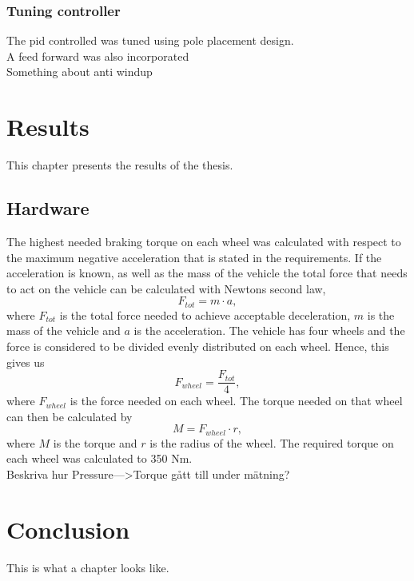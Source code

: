 \documentclass[a4paper,11pt]{kth-mag}
\begin{document}
\subsection{Tuning controller}
The \gls{pid} controlled was tuned using pole placement design. \\

A feed forward was also incorporated\\

Something about anti windup\\



\chapter{Results}
This chapter presents the results of the thesis.
\section{Hardware}
The highest needed braking torque on each wheel was calculated with respect to the maximum negative acceleration that is stated in the requirements. If the acceleration is known, as well as the mass of the vehicle the total force that needs to act on the vehicle can be calculated with Newtons second law, 
\begin{equation}
F_{tot}=m\cdot a,
\end{equation}
where $F_{tot}$ is the total force needed to achieve acceptable deceleration, $m$ is the mass of the vehicle and $a$ is the acceleration. The vehicle has four wheels and the force is considered to be divided evenly distributed on each wheel. Hence, this gives us 
\begin{equation}
F_{wheel}=\frac{F_{tot}}{4},
\end{equation}
where $F_{wheel}$ is the force needed on each wheel. The torque needed on that wheel can then be calculated by 
\begin{equation}
M=F_{wheel}\cdot r,
\end{equation}
where $M$ is the torque and $r$ is the radius of the wheel. The required torque on each wheel was calculated to 350 Nm.\\

Beskriva hur Pressure--->Torque gått till under mätning? 




\chapter{Conclusion}
This is what a chapter looks like.
\end{document}
